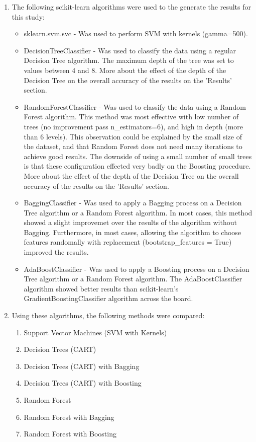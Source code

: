 \documentclass[10pt,twocolumn]{article}
\begin{document}
\begin{enumerate}
  \item The following scikit-learn algorithms were used to the generate the results for this study:
    \begin{itemize}
      \item sklearn.svm.svc - Was used to perform SVM with kernels (gamma=500).
      \item DecisionTreeClassifier - Was used to classify the data using a regular Decision Tree algorithm. The maximum depth of the tree was set to values between 4 and 8. More about the effect of the depth of the Decision Tree on the overall accuracy of the results on the 'Results' section.
      \item RandomForestClassifier - Was used to classify the data using a Random Forest algorithm. This method was most effective with low number of trees (no improvement pass n\_estimators=6), and high in depth (more than 6 levels). This observation could be explained by the small size of the dataset, and that Random Forest does not need many iterations to achieve good results. The downside of using a small number of small trees is that these configuration effected very badly on the Boosting procedure. More about the effect of the depth of the Decision Tree on the overall accuracy of the results on the 'Results' section.
      \item BaggingClassifier - Was used to apply a Bagging process on a Decision Tree algorithm or a Random Forest algorithm. In most cases, this method showed a slight improvemet over the results of the algorithm without Bagging. Furthermore, in most cases, allowing the algorithm to choose features randomally with replacement (bootstrap\_features = True) improved the results.
      \item AdaBoostClassifier - Was used to apply a Boosting process on a Decision Tree algorithm or a Random Forest algorithm. The AdaBoostClassifier algorithm showed better results than scikit-learn's GradientBoostingClassifier algorithm across the board.
    \end{itemize}

    \item Using these algorithms, the following methods were compared:
    \begin{enumerate}
      \item Support Vector Machines (SVM with Kernels)
      \item Decision Trees (CART)
      \item Decision Trees (CART) with Bagging
      \item Decision Trees (CART) with Boosting
      \item Random Forest
      \item Random Forest with Bagging
      \item Random Forest with Boosting
    \end{enumerate}

\end{enumerate}
\end{document}

